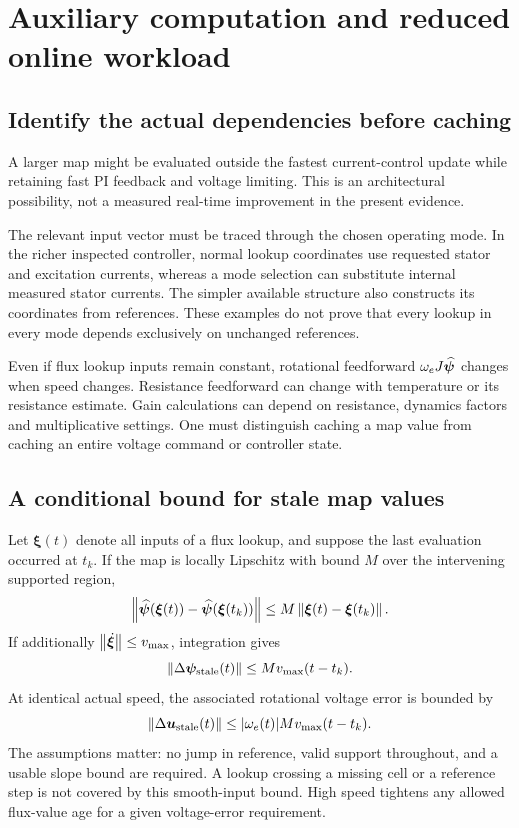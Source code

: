 \section{Auxiliary computation and reduced online workload}
\subsection{Identify the actual dependencies before caching}
A larger map might be evaluated outside the fastest current-control update while retaining fast PI feedback and voltage limiting. This is an architectural possibility, not a measured real-time improvement in the present evidence.

The relevant input vector must be traced through the chosen operating mode. In the richer inspected controller, normal lookup coordinates use requested stator and excitation currents, whereas a mode selection can substitute internal measured stator currents. The simpler available structure also constructs its coordinates from references. These examples do not prove that every lookup in every mode depends exclusively on unchanged references.

Even if flux lookup inputs remain constant, rotational feedforward $\omega_e J\widehat{\bm\psi}$ changes when speed changes. Resistance feedforward can change with temperature or its resistance estimate. Gain calculations can depend on resistance, dynamics factors and multiplicative settings. One must distinguish caching a map value from caching an entire voltage command or controller state.

\subsection{A conditional bound for stale map values}
Let $\bm\xi(t)$ denote all inputs of a flux lookup, and suppose the last evaluation occurred at $t_k$. If the map is locally Lipschitz with bound $M$ over the intervening supported region,
\begin{equation}
\left\lVert\widehat{\bm\psi}(\bm\xi(t))-\widehat{\bm\psi}(\bm\xi(t_k))\right\rVert
\le M\left\lVert\bm\xi(t)-\bm\xi(t_k)\right\rVert.
\end{equation}
If additionally $\left\lVert\dot{\bm\xi}\right\rVert\le v_{\max}$, integration gives
\begin{equation}
\left\lVert\Delta\bm\psi_{\rm stale}(t)\right\rVert
\le M v_{\max}(t-t_k).
\end{equation}
At identical actual speed, the associated rotational voltage error is bounded by
\begin{equation}
\left\lVert\Delta\bm u_{\rm stale}(t)\right\rVert
\le|\omega_e(t)|M v_{\max}(t-t_k).
\end{equation}
The assumptions matter: no jump in reference, valid support throughout, and a usable slope bound are required. A lookup crossing a missing cell or a reference step is not covered by this smooth-input bound. High speed tightens any allowed flux-value age for a given voltage-error requirement.

